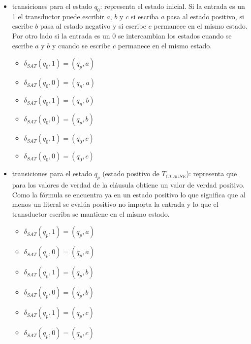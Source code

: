 \documentclass[12pt]{article}
\begin{document}
\begin{itemize}
    \item  transiciones para el estado $q_0$: representa el estado inicial. Si la entrada es un 1 el transductor
          puede escribir $a$, $b$ y $c$ si escriba $a$ pasa al estado positivo, si escribe $b$ pasa al estado negativo
          y si escribe $c$ permanece en el mismo estado. Por otro lado si la entrada es un 0 se intercambian los estados 
          cuando se escribe $a$ y $b$ y cuando se escribe $c$ permanece en el mismo estado.
          
          \begin{multicols}{2}
              \begin{itemize}
                  \item $\delta_{SAT}(q_0,1)=(q_p,a)$
                  \item $\delta_{SAT}(q_0,0)=(q_n,a)$
                  \item $\delta_{SAT}(q_0,1)=(q_n,b)$
                  \item $\delta_{SAT}(q_0,0)=(q_p,b)$
                  \item $\delta_{SAT}(q_0,1)=(q_0,c)$
                  \item $\delta_{SAT}(q_0,0)=(q_0,c)$
              \end{itemize}
          \end{multicols}
          
    \item  transiciones para el estado $q_p$ (estado positivo de $T_{CLAUSE}$): representa que para los valores de verdad de la cláusula obtiene un valor de verdad positivo.
          Como la fórmula se encuentra ya en un estado positivo lo que significa que al menos un literal se evalúa positivo no importa
          la entrada y lo que el transductor escriba se mantiene en el mismo estado.      
          
          \begin{multicols}{2}
              \begin{itemize}
                  \item $\delta_{SAT}(q_{p},1)=(q_{p},a)$
                  \item $\delta_{SAT}(q_{p},0)=(q_{p},a)$
                  \item $\delta_{SAT}(q_{p},1)=(q_{p},b)$
                  \item $\delta_{SAT}(q_{p},0)=(q_{p},b)$
                  \item $\delta_{SAT}(q_{p},1)=(q_{p},c)$
                  \item $\delta_{SAT}(q_{p},0)=(q_{p},c)$
              \end{itemize}
          \end{multicols}
          

\end{itemize}
\end{document}
